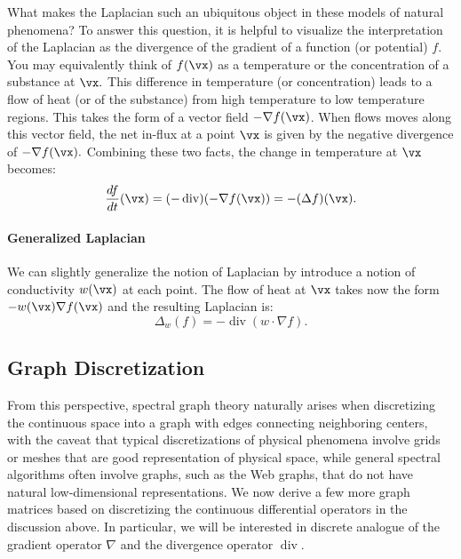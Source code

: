 What makes the Laplacian such an ubiquitous object in these models of natural phenomena? To answer this question, it is helpful to visualize the interpretation of the Laplacian as the divergence of the gradient of a function (or potential) $f$. You may equivalently think of $f(\vx)$ as a temperature or the concentration of a substance at $\vx.$
This difference in temperature (or concentration) leads to a flow of heat (or of the substance) from high temperature to low temperature regions.
This takes the form of a vector field $-\nabla f(\vx)$. When flows moves along this vector field, the net in-flux at a point $\vx$ is given by the negative divergence of $-\nabla f(\vx).$  Combining these two facts, the change in temperature at $\vx$ becomes:
$$
\frac{df}{dt}(\vx) = (-\operatorname{div})(-\nabla f(\vx)) = - (\Delta f)(\vx).
$$

\paragraph{Generalized Laplacian} We can slightly generalize the notion of Laplacian by introduce a notion of conductivity $w(\vx)$ at each point. The flow of heat at $\vx$ takes now the form $-w(\vx) \nabla f(\vx)$ and the resulting Laplacian is:
$$
\Delta_w(f) = -\operatorname{div}(w \cdot \nabla f).
$$



\subsection{Graph Discretization} 

From this perspective, spectral graph theory naturally arises when discretizing the continuous space into a graph with edges connecting neighboring centers, with the caveat that typical discretizations of physical phenomena involve grids or meshes that are good representation of physical space, while general spectral algorithms often involve graphs, such as the Web graphs, that do not have natural low-dimensional representations. We now derive a few more graph matrices based on discretizing the continuous differential operators in the discussion above. In particular, we will be interested in discrete analogue of the gradient operator $\nabla$ and the divergence operator $\operatorname{div}.$



